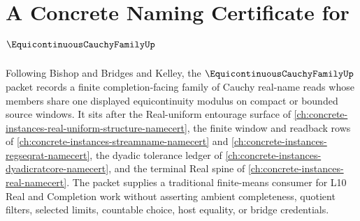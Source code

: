 \chapter{A Concrete Naming Certificate for $\EquicontinuousCauchyFamilyUp$}
\label{ch:concrete-instances-equicontinuous-cauchy-family-namecert}

Following Bishop and Bridges and Kelley, the $\EquicontinuousCauchyFamilyUp$ packet records a finite completion-facing family of Cauchy real-name reads whose members share one displayed equicontinuity modulus on compact or bounded source windows. It sits after the Real-uniform entourage surface of \autoref{ch:concrete-instances-real-uniform-structure-namecert}, the finite window and readback rows of \autoref{ch:concrete-instances-streamname-namecert} and \autoref{ch:concrete-instances-regseqrat-namecert}, the dyadic tolerance ledger of \autoref{ch:concrete-instances-dyadicratcore-namecert}, and the terminal Real spine of \autoref{ch:concrete-instances-real-namecert}. The packet supplies a traditional finite-means consumer for L10 Real and Completion work without asserting ambient completeness, quotient filters, selected limits, countable choice, host equality, or bridge credentials.

